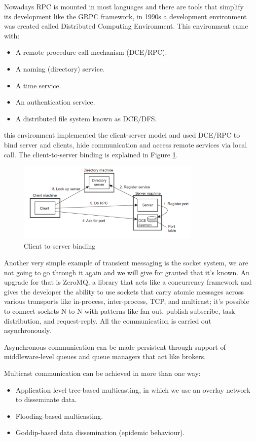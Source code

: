 Nowadays RPC is mounted in most languages and there are tools that simplify its development like the GRPC framework, in 1990s a development environment was created called Distributed Computing Environment. This environment came with:
\begin{itemize}
    \item A remote procedure call mechanism (DCE/RPC).
    \item A naming (directory) service.
    \item A time service.
    \item An authentication service.
    \item A distributed file system known as DCE/DFS.
\end{itemize}
this environment implemented the client-server model and used DCE/RPC to bind server and clients, hide communication and access remote services via local call. The client-to-server binding is explained in Figure \ref{fig:client_server_binding}.
\begin{figure}
    \centering
    \includegraphics[width=0.8\textwidth]{img/Client_server_binding_DCE.png}
    \caption{Client to server binding}
    \label{fig:client_server_binding}
\end{figure}
Another very simple example of transient messaging is the socket system, we are not going to go through it again and we will give for granted that it's known. An upgrade for that is ZeroMQ, a library that acts like a concurrency framework and gives the developer the ability to use sockets that carry atomic messages across various transports like in-process, inter-process, TCP, and multicast; it's possible to connect sockets N-to-N with patterns like fan-out, publish-subscribe, task distribution, and request-reply. All the communication is carried out asynchronously.

Asynchronous communication can be made persistent through support of middleware-level queues and queue managers that act like brokers.

Multicast communication can be achieved in more than one way:
\begin{itemize}
    \item Application level tree-based multicasting, in which we use an overlay network to disseminate data.
    \item Flooding-based multicasting.
    \item Goddip-based data dissemination (epidemic behaviour).
\end{itemize}